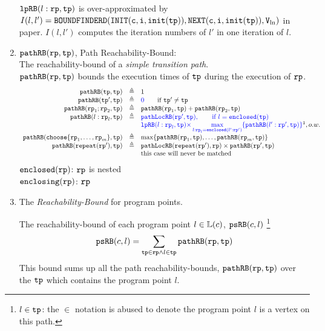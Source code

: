\begin{enumerate}
      $\mathtt{lpRB}(l:\mathtt{rp}, \mathtt{tp})$ is over-approximated by
      $I(l, l') = \mathtt{BOUNDFINDERD(INIT(c, i, \mathtt{init}(\mathtt{tp})), NEXT(c, i, \mathtt{init}(\mathtt{tp})), V_{\ln})}$ in paper\cite{GulwaniJK09}.
      $I(l, l')$ computes the iteration numbers of $l'$ in one iteration of $l$.
      \item $\mathtt{pathRB}(\mathtt{rp}, \mathtt{tp}) $, Path Reachability-Bound:  
      \\
      The reachability-bound of a \emph{simple transition path}.
      \\
      $\mathtt{pathRB}(\mathtt{rp}, \mathtt{tp}) $ bounds the execution times of $\mathtt{tp}$ during the execution of $\mathtt{rp}$.
  \[
    \begin{array}{rcl}
      \inoutB(\tpath, \tpath) & \triangleq & 1  \\
      \inoutB(\tpath', \tpath) & \triangleq & \highlight{0} \qquad \text{if } \tpath' \neq \tpath\\
      \inoutB(\rprog_1;\rprog_2, \tpath) & \triangleq & \inoutB(\rprog_1, \tpath) + \inoutB(\rprog_2, \tpath) \\
      \inoutB(l: \rprog_l, \tpath) & \triangleq & 
      \highlight{\outinB(\rprog', \tpath), \qquad \text{if } l = \kw{enclosed}(\tpath)}
      \\
      &  & 
      \highlight{
        \lpchB(l:\rprog_l, \tpath ) }
      \highlight{\times \max\limits_{l:\rprog_l = \kw{enclosed}(l':\rprog')}
     \{\inoutB(l':\rprog', \tpath)\} } \footnotemark, o.w. \\
      \inoutB(\rpchoose{\rprog_1, \ldots, \rprog_m }, \tpath) & \triangleq 
      & \max\left\{ \inoutB(\rprog_1, \tpath), \ldots, \inoutB(\rprog_m, \tpath) \right\} 
      \\
      \inoutB(\rprepeat(\rprog'), \tpath) & \triangleq & \outinB(\rprepeat(\rprog'), \rprog) \times \inoutB(\rprog', \tpath)\\
      &  & \text{this case will never be matched}
      \end{array}
    \]
        $\mathtt{enclosed}(\mathtt{rp})$:  $\mathtt{rp}$ is nested
        \\
        $\mathtt{enclosing}(\mathtt{rp})$:  $\mathtt{rp}$
      \item The \emph{Reachability-Bound} for program points.
    
    The reachability-bound of each program point $l \in \mathbb{L}(c)$, $\mathtt{psRB}(c, l)$
    \footnote{$l \in \mathtt{tp}$: the $\in$ notation is abused to denote
    the program point $l$ is a vertex on this path.}
   \[ 
     \mathtt{psRB}(c, l) = 
     \sum\limits_{\mathtt{tp} \in \mathtt{rp} \land 
   l \in \mathtt{tp}} 
   \mathtt{pathRB}(\mathtt{rp}, \mathtt{tp})
   \]
   This bound sums up all the path reachability-bounds, $\mathtt{pathRB}(\mathtt{rp}, \mathtt{tp})$ over the $\mathtt{tp}$ which contains the program point $l$.
%
\end{enumerate}